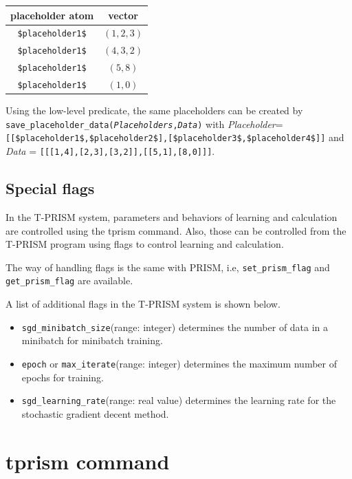 \documentclass[a4paper]{report}
\begin{document}
\begin{tabular}{|c|c|}
	\hline 
	placeholder atom& vector \\ 
	\hline 
	\verb|$placeholder1$|& $(1,2,3)$ \\ 
	\hline 
	\verb|$placeholder1$|& $(4,3,2)$ \\ 
	\hline 
	\verb|$placeholder1$|& $(5,8)$ \\ 
	\hline 
	\verb|$placeholder1$|& $(1,0)$ \\ 
	\hline 
\end{tabular} 

Using the low-level predicate, the same placeholders can be created by {\tt save\_placeholder\_data({\it Placeholders},{\it Data})} with
{\it Placeholder}={\tt [[\$placeholder1\$,\$placeholder2\$],[\$placeholder3\$,\$placeholder4\$]]}
and {\it Data} = {\tt [[[1,4],[2,3],[3,2]],[[5,1],[8,0]]]}.






\subsection{Special flags}
In the T-PRISM system, parameters and behaviors of learning and calculation are controlled using the tprism command.
Also, those can be controlled from the T-PRISM program using flags to control learning and calculation.

The way of handling flags is the same with PRISM, i.e, {\tt set\_prism\_flag} and {\tt get\_prism\_flag} are available.


A list of additional flags in the T-PRISM system is shown below.
\begin{itemize}
\item \verb|sgd_minibatch_size|(range: integer) determines the number of data in a minibatch for minibatch training.
\item \verb|epoch| or \verb|max_iterate|(range: integer) determines the maximum number of epochs for training.
\item \verb|sgd_learning_rate|(range: real value) determines the learning rate for the stochastic gradient decent method.
\end{itemize}


\section{tprism command}
\label{sec:tprism_command}
\end{document}
